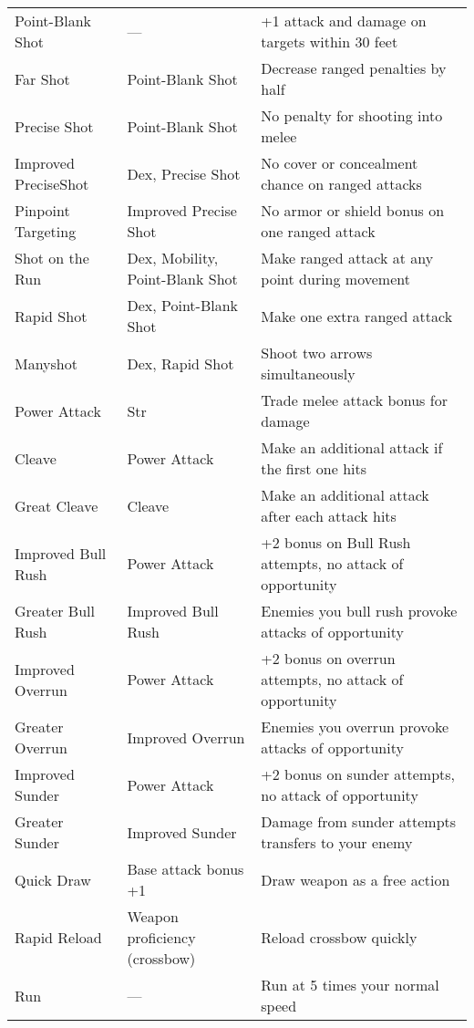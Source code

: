 \begin{table*}
  \sffamily
  \setlength{\tabcolsep}{1pt}
\begin{tabularx}{\linewidth}{lXl}
Point-Blank Shot & --- & +1 attack and damage on targets within 30 feet\\
\quad Far Shot & Point-Blank Shot & Decrease ranged penalties by half\\
\quad Precise Shot & Point-Blank Shot & No penalty for shooting into melee\\
\quad \quad Improved PreciseShot & Dex, Precise Shot & No cover or concealment chance on ranged attacks\\
\quad  Pinpoint Targeting & Improved Precise Shot & No armor or shield bonus on one ranged attack\\
\quad Shot on the Run & Dex, Mobility, Point-Blank Shot & Make ranged attack at any point during movement\\
\quad Rapid Shot & Dex, Point-Blank Shot & Make one extra ranged attack\\
\quad \quad Manyshot & Dex, Rapid Shot & Shoot two arrows simultaneously\\
Power Attack & Str & Trade melee attack bonus for damage\\
\quad Cleave & Power Attack & Make an additional attack if the first one hits\\
\quad \quad Great Cleave & Cleave & Make an additional attack after each attack hits\\
\quad Improved Bull Rush & Power Attack & +2 bonus on Bull Rush attempts, no attack of opportunity\\
\quad \quad Greater Bull Rush & Improved Bull Rush & Enemies you bull rush provoke attacks of opportunity\\
\quad Improved Overrun & Power Attack & +2 bonus on overrun attempts, no attack of opportunity\\
\quad \quad Greater Overrun & Improved Overrun & Enemies you overrun provoke attacks of opportunity \\
\quad Improved Sunder & Power Attack & +2 bonus on sunder attempts, no attack of opportunity\\
\quad \quad Greater Sunder & Improved Sunder & Damage from sunder attempts transfers to your enemy\\
Quick Draw & Base attack bonus +1 & Draw weapon as a free action\\
Rapid Reload & Weapon proficiency (crossbow) & Reload crossbow quickly\\
Run & --- & Run at 5 times your normal speed\\

\end{tabularx}
\end{table*}
